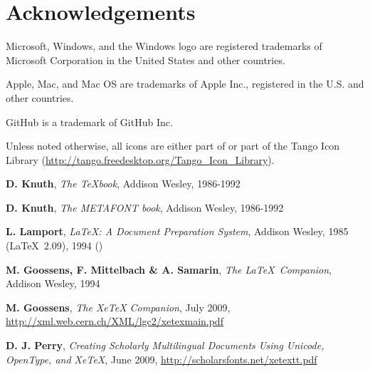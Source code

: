 
\chapter*{Acknowledgements}

Microsoft, Windows, and the Windows logo are registered trademarks of Microsoft Corporation in the United States and other countries.

Apple, Mac, and Mac OS are trademarks of Apple Inc., registered in the U.S. and other countries.

GitHub is a trademark of GitHub Inc.

Unless noted otherwise, all icons are either part of {\Tw} or part of the Tango Icon Library (\url{http://tango.freedesktop.org/Tango_Icon_Library}).

\begin{thebibliography}{xx}
\textbf{D. Knuth}, \textsl{The \TeX book}, Addison Wesley, 1986-1992

\textbf{D. Knuth}, \textsl{The METAFONT book}, Addison Wesley, 1986-1992

\textbf{L. Lamport}, \textsl{\LaTeX: A Document Preparation System}, Addison Wesley, 1985 (\LaTeX\ 2.09), 1994 (\LaTeXe)

\textbf{M. Goossens, F. Mittelbach \& A. Samarin}, \textsl{The \LaTeX\ Companion}, Addison Wesley, 1994

\textbf{M. Goossens}, \textsl{The XeTeX Companion}, July 2009, \url{http://xml.web.cern.ch/XML/lgc2/xetexmain.pdf}

\textbf{D. J. Perry}, \textsl{Creating Scholarly Multilingual Documents Using Unicode, OpenType, and XeTeX}, June 2009, \url{http://scholarsfonts.net/xetextt.pdf}

\end{thebibliography}

\printindex
